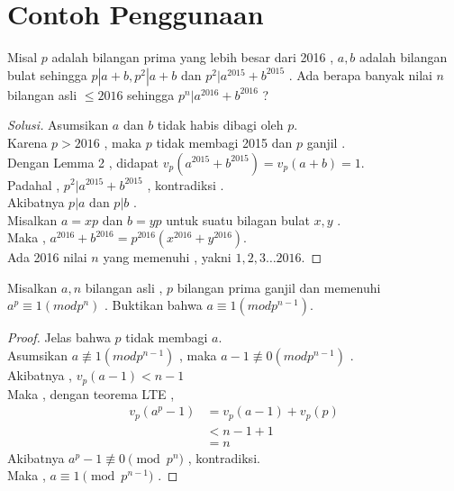 \documentclass{article}
\begin{document}
\section{Contoh Penggunaan}
\begin{example}
Misal $p$ adalah bilangan prima yang lebih besar dari 2016 , $a,b$ adalah bilangan bulat sehingga $p|a+b , p^2|a+b$ dan $p^2|a^{2015}+b^{2015}$ . Ada berapa banyak nilai $n$ bilangan asli $\leq 2016$ sehingga $p^n|a^{2016}+b^{2016}$ ?
\end{example}
\begin{proof}[Solusi]
Asumsikan $a$ dan $b$ tidak habis dibagi oleh $p$.\\
Karena $p>2016$ , maka $p$ tidak membagi 2015 dan $p$ ganjil .\\
Dengan Lemma 2 , didapat $v_p(a^{2015}+b^{2015})=v_p(a+b)=1.$\\
Padahal , $p^2|a^{2015}+b^{2015}$ , kontradiksi .\\
Akibatnya $p|a$ dan $p|b$ . \\
Misalkan $a=xp$ dan $b=yp$ untuk suatu bilagan bulat $x,y$ .\\
Maka , $a^{2016}+b^{2016}=p^{2016}(x^{2016}+y^{2016})$.\\
Ada 2016 nilai $n$ yang memenuhi , yakni ${{1,2,3\dots 2016}}.$
\end{proof}
\begin{example}
Misalkan $a,n$ bilangan asli , $p$ bilangan prima ganjil dan memenuhi $a^p \equiv 1(mod p^n)$ . Buktikan bahwa $a\equiv 1(mod p^{n-1}).$
\end{example}
\begin{proof}
Jelas bahwa $p$ tidak membagi $a$.\\
Asumsikan $a\not\equiv 1(mod p^{n-1})$ , maka $a-1 \not\equiv 0(mod p^{n-1})$  .\\
Akibatnya , $v_p(a-1)<n-1$\\
Maka , dengan teorema LTE ,
\begin{equation} 
    \begin{split}
    v_p(a^p-1) & = v_p(a-1) +v_p(p)\\
               & < n-1 +1 \\
               & = n
    \end{split}
\end{equation}
Akibatnya $a^p-1 \not\equiv 0 \pmod{p^n}$ , kontradiksi.\\
Maka , $a \equiv 1 \pmod{p^{n-1}}$ .
\end{proof}
\end{document}
